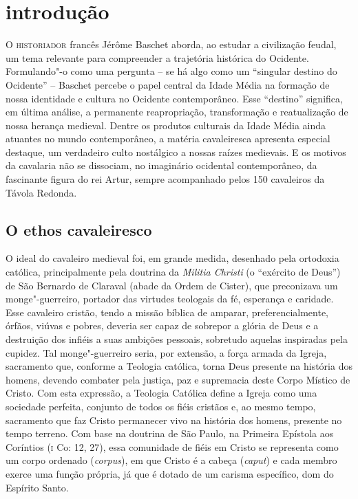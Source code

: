 \chapter[Introdução, por Marcus Baccega]{introdução}

\textsc{O historiador} francês Jérôme Baschet aborda, ao estudar a civilização
feudal, um tema relevante para compreender a trajetória histórica do Ocidente.
Formulando"-o como uma pergunta -- se há algo como um “singular destino do
Ocidente'' -- Baschet percebe o papel central da Idade Média na formação de nossa
identidade e cultura no Ocidente contemporâneo. Esse ``destino'' significa, em
última análise, a permanente reapropriação, transformação e reatualização de
nossa herança medieval. Dentre os produtos culturais da Idade Média ainda
atuantes no mundo contemporâneo, a matéria cavaleiresca apresenta especial
destaque, um verdadeiro culto nostálgico a nossas raízes medievais. E os motivos
da cavalaria não se dissociam, no imaginário ocidental contemporâneo, da
fascinante figura do rei Artur, sempre acompanhado pelos 150 cavaleiros da
Távola Redonda.

\section{O ethos cavaleiresco}

O ideal do cavaleiro medieval foi, em grande medida, desenhado pela ortodoxia
católica, principalmente pela doutrina da \textit{Militia Christi} (o “exército
de Deus”) de São Bernardo de Claraval (abade da Ordem de Cister), que
preconizava um monge"-guerreiro, portador das virtudes teologais da fé, esperança
e caridade. Esse cavaleiro cristão, tendo a missão bíblica de amparar,
preferencialmente, órfãos, viúvas e pobres, deveria ser capaz de sobrepor a
glória de Deus e a destruição dos infiéis a suas ambições pessoais, sobretudo
aquelas inspiradas pela cupidez. Tal monge"-guerreiro seria, por extensão, a
força armada da Igreja, sacramento que, conforme a Teologia católica, torna Deus
presente na história dos homens, devendo combater pela justiça, paz e supremacia
deste Corpo Místico de Cristo. Com esta expressão, a Teologia Católica define a
Igreja como uma sociedade perfeita, conjunto de todos os fiéis cristãos e, ao
mesmo tempo, sacramento que faz Cristo permanecer vivo na história dos homens,
presente no tempo terreno. Com base na doutrina de São Paulo, na Primeira
Epístola aos Coríntios (\textsc{i} Co: 12, 27), essa comunidade de fiéis em
Cristo se representa como um corpo ordenado (\textit{corpus}), em que Cristo é a
cabeça (\textit{caput}) e cada membro exerce uma função própria, já que é dotado
de um carisma específico, dom do Espírito Santo.

